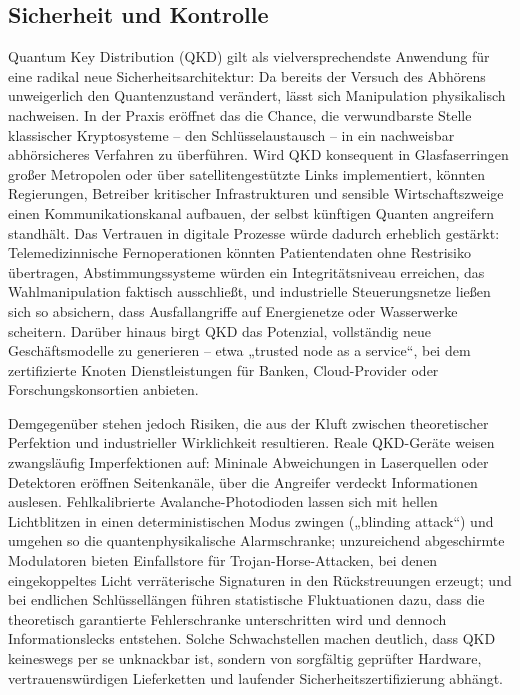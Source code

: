 {\subsection{Sicherheit und Kontrolle}
Quantum Key Distribution (QKD) gilt als vielversprechendste Anwendung für eine radikal neue Sicherheitsarchitektur: Da bereits der Versuch des Abhörens unweigerlich den Quantenzustand verändert, lässt sich Manipulation physikalisch nachweisen. In der Praxis eröffnet das die Chance, die verwundbarste Stelle klassischer Kryptosysteme – den Schlüsselaustausch – in ein nachweisbar abhörsicheres Verfahren zu überführen. Wird QKD konsequent in Glasfaserringen großer Metropolen oder über satellitengestützte Links implementiert, könnten Regierungen, Betreiber kritischer Infrastrukturen und sensible Wirtschaftszweige einen Kommunikationskanal aufbauen, der selbst künftigen Quanten angreifern standhält. Das Vertrauen in digitale Prozesse würde dadurch erheblich gestärkt: Telemedizinnische Fernoperationen könnten Patientendaten ohne Restrisiko übertragen, Abstimmungssysteme würden ein Integritätsniveau erreichen, das Wahlmanipulation faktisch ausschließt, und industrielle Steuerungsnetze ließen sich so absichern, dass Ausfallangriffe auf Energienetze oder Wasserwerke scheitern. Darüber hinaus birgt QKD das Potenzial, vollständig neue Geschäftsmodelle zu generieren – etwa „trusted node as a service“, bei dem zertifizierte Knoten Dienstleistungen für Banken, Cloud-Provider oder Forschungskonsortien anbieten.

Demgegenüber stehen jedoch Risiken, die aus der Kluft zwischen theoretischer Perfektion und industrieller Wirklichkeit resultieren. Reale QKD-Geräte weisen zwangsläufig Imperfektionen auf: Mininale Abweichungen in Laserquellen oder Detektoren eröffnen Seitenkanäle, über die Angreifer verdeckt Informationen auslesen. Fehlkalibrierte Avalanche-Photodioden lassen sich mit hellen Lichtblitzen in einen deterministischen Modus zwingen („blinding attack“) und umgehen so die quantenphysikalische Alarmschranke; unzureichend abgeschirmte Modulatoren bieten Einfallstore für Trojan-Horse-Attacken, bei denen eingekoppeltes Licht verräterische Signaturen in den Rückstreuungen erzeugt; und bei endlichen Schlüssellängen führen statistische Fluktuationen dazu, dass die theoretisch garantierte Fehlerschranke unterschritten wird und dennoch Informationslecks entstehen. Solche Schwachstellen machen deutlich, dass QKD keineswegs per se unknackbar ist, sondern von sorgfältig geprüfter Hardware, vertrauenswürdigen Lieferketten und laufender Sicherheitszertifizierung abhängt.

}
